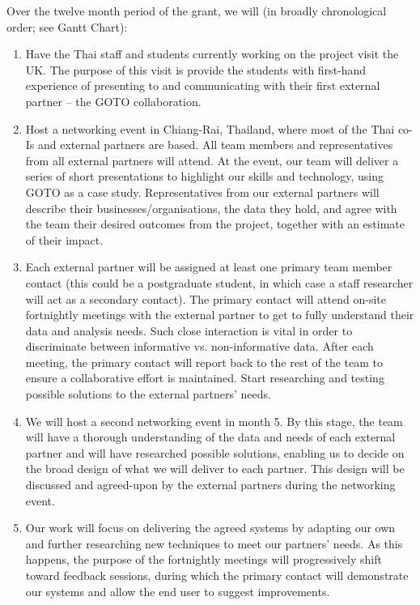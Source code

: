 \documentclass[11pt]{article}
\begin{document}
  \noindent
  Over the twelve month period of the grant, we will (in broadly chronological order; see Gantt Chart):
  \begin{enumerate}[leftmargin=6mm,itemsep=-3pt,topsep=1pt]
  \item Have the Thai staff and students currently working on the project visit the UK. The purpose of this visit is provide the students with first-hand experience of presenting to and communicating with their first external partner -- the GOTO collaboration.
  \item Host a networking event in Chiang-Rai, Thailand, where most of the Thai co-Is and external partners are based. All team members and representatives from all external partners will attend. At the event, our team will deliver a series of short presentations to highlight our skills and technology, using GOTO as a case study. Representatives from our external partners will describe their businesses/organisations, the data they hold, and agree with the team their desired outcomes from the project, together with an estimate of their impact.
  \item Each external partner will be assigned at least one primary team member contact (this could be a postgraduate student, in which case a staff researcher will act as a secondary contact). The primary contact will attend on-site fortnightly meetings with the external partner to get to fully understand their data and analysis needs. Such close interaction is vital in order to discriminate between informative vs. non-informative data. After each meeting, the primary contact will report back to the rest of the team to ensure a collaborative effort is maintained. Start researching and testing possible solutions to the external partners' needs.
  \item We will host a second networking event in month 5. By this stage, the team will have a thorough understanding of the data and needs of each external partner and will have researched possible solutions, enabling us to decide on the broad design of what we will deliver to each partner. This design will be discussed and agreed-upon by the external partners during the networking event. 
  \item Our work will focus on delivering the agreed systems by adapting our own and further researching new techniques to meet our partners' needs. As this happens, the purpose of the fortnightly meetings will progressively shift toward feedback sessions, during which the primary contact will demonstrate our systems and allow the end user to suggest improvements. 

\end{enumerate}
\end{document}

